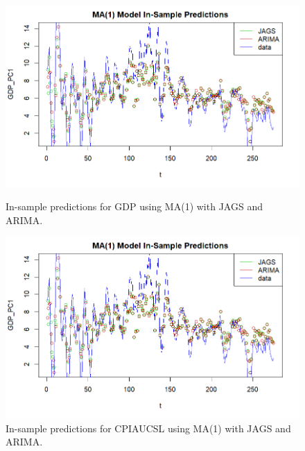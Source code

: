\begin{figure}[H]
    \centering
    \begin{minipage}{0.49\textwidth}
        \centering
        \includegraphics[width=\textwidth]{images/3-MA/ARIMA_MA1_predictions_gdp.png}
        \caption{In-sample predictions for GDP using MA(1) with JAGS and ARIMA.}
        \label{fig:ARIMA_MA1_gdp_prediction}
    \end{minipage}\hfill
    \begin{minipage}{0.49\textwidth}
        \centering
        \includegraphics[width=\textwidth]{images/3-MA/ARIMA_MA1_predictions_gdp.png}
        \caption{In-sample predictions for CPIAUCSL using MA(1) with JAGS and ARIMA.}
        \label{fig:ARIMA_MA1_infl_prediction}
    \end{minipage}
\end{figure}
